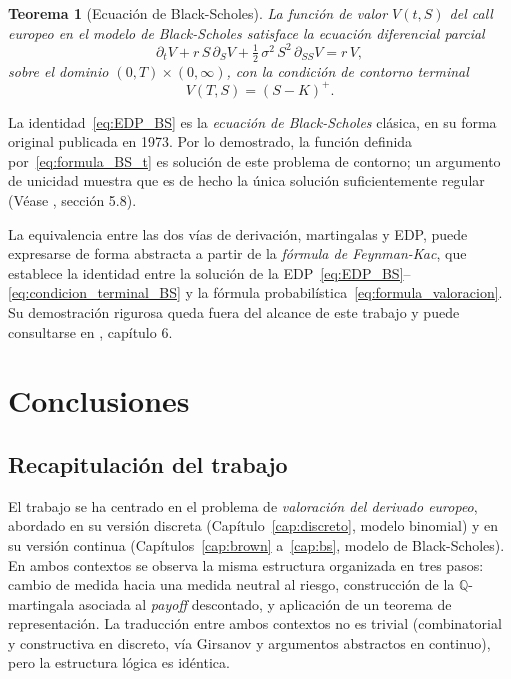\documentclass[11pt,a4paper,oneside]{report}
\theoremstyle{plain}
\newtheorem{teorema}{Teorema}[chapter]
\theoremstyle{definition}
\theoremstyle{remark}
\newcommand{\Q}{\mathbb{Q}}
\newcommand{\1}{\mathbf{1}}
\begin{document}
\begin{teorema}[Ecuación de Black-Scholes]
\label{teo:edp_BS}
La función de valor $V(t, S)$ del \emph{call} europeo en el modelo de
Black-Scholes satisface la ecuación diferencial parcial
\begin{equation}\label{eq:EDP_BS}
  \boxed{\;
    \partial_t V + r\, S\, \partial_S V
    + \tfrac{1}{2}\, \sigma^2\, S^2\, \partial_{SS} V = r\, V,
  \;}
\end{equation}
sobre el dominio $(0, T) \times (0, \infty)$, con la condición de
contorno terminal
\begin{equation}\label{eq:condicion_terminal_BS}
  V(T, S) = (S - K)^+.
\end{equation}
\end{teorema}

La identidad~\eqref{eq:EDP_BS} es la \emph{ecuación de Black-Scholes}
clásica, en su forma original publicada en 1973. Por lo demostrado, la
función definida por~\eqref{eq:formula_BS_t} es solución de este
problema de contorno; un argumento de unicidad muestra que es
de hecho la única solución suficientemente regular
(Véase \cite{karatzas-shreve}, sección 5.8).

La equivalencia entre
las dos vías de derivación, martingalas y EDP, puede expresarse de forma abstracta a partir de la \emph{fórmula de Feynman-Kac}, que establece la
identidad entre la solución de la
EDP~\eqref{eq:EDP_BS}–\eqref{eq:condicion_terminal_BS} y la fórmula
probabilística~\eqref{eq:formula_valoracion}. Su demostración rigurosa
queda fuera del alcance de este trabajo y puede consultarse en
\cite{shreve}, capítulo 6.

\chapter{Conclusiones}\label{cap:conclusiones}
\section{Recapitulación del trabajo}
\label{sec:recapitulacion}

El trabajo se ha centrado en el problema de \emph{valoración
del derivado europeo}, abordado en su versión discreta
(Capítulo~\ref{cap:discreto}, modelo binomial) y en su versión
continua (Capítulos~\ref{cap:brown} a~\ref{cap:bs}, modelo de
Black-Scholes). En ambos contextos se observa la misma estructura organizada en tres pasos: cambio de medida hacia una medida neutral
al riesgo, construcción de la $\Q$-martingala asociada al
\emph{payoff} descontado, y aplicación de un teorema de
representación. La traducción entre ambos contextos no es trivial (combinatorial y constructiva en discreto, vía Girsanov y argumentos
abstractos en continuo), pero la estructura lógica es idéntica.
\end{document}
